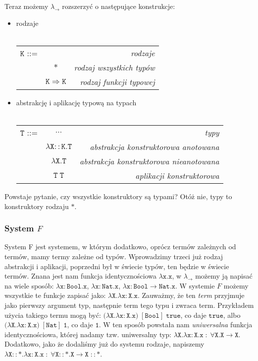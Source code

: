 \documentclass[11pt,leqno]{article}
\begin{document}
Teraz możemy $\lambda_{\rightarrow}$ rozszerzyć o następujące konstrukcje: 
\begin{itemize}
    \item rodzaje \\ \\
\begin{tabular}{| l c r |}
  \hline
  $\mathtt{K}$ ::= &  & \textit{rodzaje}  \\
   & $\mathtt{\ast}$ & \textit{rodzaj wszystkich typów} \\
   & $\mathtt{K \Rightarrow K}$ & \textit{rodzaj funkcji typowej} \\
  \hline
\end{tabular}
    \item abstrakcję i aplikację typową na typach \\ \\
\begin{tabular}{| l c r |}
   \hline
   $\mathtt{T}$ ::= & $\dots$ & \textit{typy}  \\
   & $\mathtt{\lambda X::K.T}$ & \textit{abstrakcja konstruktorowa anotowana} \\
   & $\mathtt{\lambda X.T}$ & \textit{abstrakcja konstruktorowa nieanotowana} \\
   & $\mathtt{T\;T}$ & \textit{aplikacji konstruktorowa} \\
   \hline
\end{tabular}
\end{itemize} 

Powstaje pytanie, czy wszystkie konstruktory są typami? Otóż nie, typy to konstruktory rodzaju $\mathtt{\ast}$.

\subsubsection{System $F$}

System F jest systemem, w którym dodatkowo, oprócz termów zależnych od termów, mamy termy zależne od typów. Wprowadzimy trzeci już rodzaj abstrakcji i aplikacji, poprzedni był w świecie typów, ten będzie w świecie termów. Znana jest nam funkcja identycznościowa $\mathtt{\lambda x.x}$, w $\lambda_{\rightarrow}$ możemy ją napisać na wiele sposób: $\mathtt{\lambda x:Bool.x}$, $\mathtt{\lambda x:Nat.x}$, $\mathtt{\lambda x:Bool \rightarrow Nat.x}$. W systemie $F$ możemy wszystkie te funkcje zapisać jako: $\mathtt{\lambda X. \lambda x:X.x}$. Zauważmy, że ten \textit{term} przyjmuje jako pierwszy argument typ, następnie term tego typu i zwraca term. Przykładem użycia takiego termu mogą być: $(\mathtt{\lambda X. \lambda x:X.x)\;[Bool]\;true}$, co daje $\mathtt{true}$, albo $(\mathtt{\lambda X. \lambda x:X.x)\;[Nat]\;1}$, co daje $\mathtt{1}$. W ten sposób powstała nam \textit{uniwersalna} funkcja identycznościowa, której nadamy tzw. uniwersalny typ: $\mathtt{\lambda X. \lambda x:X.x \; : \; \forall X.X \rightarrow X}$. Dodatkowo, jako że dodaliśmy już do systemu rodzaje, napiszemy $\mathtt{\lambda X::\ast. \lambda x:X.x \; : \; \forall X::\ast.X \rightarrow X \; ::\ast}$. 
\end{document}
